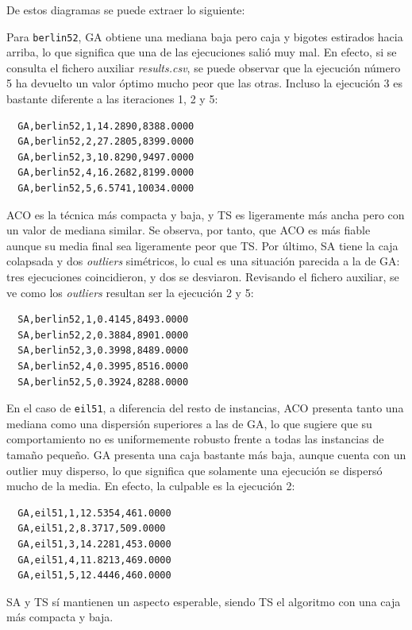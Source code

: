 De estos diagramas se puede extraer lo siguiente:

Para \texttt{berlin52}, GA obtiene una mediana baja pero caja y bigotes estirados hacia arriba, lo que significa que una
de las ejecuciones salió muy mal. En efecto, si se consulta el fichero auxiliar \textit{results.csv}, se puede observar que 
la ejecución número 5 ha devuelto un valor óptimo mucho peor que las otras. Incluso la ejecución 3 es bastante diferente a 
las iteraciones 1, 2 y 5:

\begin{verbatim}
  GA,berlin52,1,14.2890,8388.0000
  GA,berlin52,2,27.2805,8399.0000
  GA,berlin52,3,10.8290,9497.0000
  GA,berlin52,4,16.2682,8199.0000
  GA,berlin52,5,6.5741,10034.0000
\end{verbatim}

ACO es la técnica más compacta y baja, y TS es ligeramente más ancha pero con un valor de mediana similar. Se observa, por 
tanto, que ACO es más fiable aunque su media final sea ligeramente peor que TS. Por último, SA tiene la caja colapsada y dos
\textit{outliers} simétricos, lo cual es una situación parecida a la de GA: tres ejecuciones coincidieron, y dos se desviaron.
Revisando el fichero auxiliar, se ve como los \textit{outliers} resultan ser la ejecución 2 y 5:

\begin{verbatim}
  SA,berlin52,1,0.4145,8493.0000
  SA,berlin52,2,0.3884,8901.0000
  SA,berlin52,3,0.3998,8489.0000
  SA,berlin52,4,0.3995,8516.0000
  SA,berlin52,5,0.3924,8288.0000
\end{verbatim}

En el caso de \texttt{eil51}, a diferencia del resto de instancias, ACO presenta tanto una mediana como una dispersión superiores
a las de GA, lo que sugiere que su comportamiento no es uniformemente robusto frente a todas las instancias de tamaño pequeño.
GA presenta una caja bastante más baja, aunque cuenta con un outlier muy disperso, lo que significa que solamente una ejecución
se dispersó mucho de la media. En efecto, la culpable es la ejecución 2:

\begin{verbatim}
  GA,eil51,1,12.5354,461.0000
  GA,eil51,2,8.3717,509.0000
  GA,eil51,3,14.2281,453.0000
  GA,eil51,4,11.8213,469.0000
  GA,eil51,5,12.4446,460.0000
\end{verbatim}

SA y TS sí mantienen un aspecto esperable, siendo TS el algoritmo con una caja más compacta y baja.

